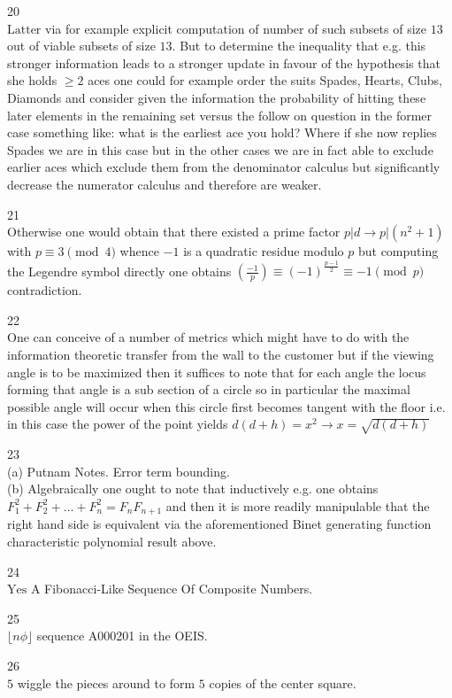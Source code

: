 20 \\
$\boxed{\text{Latter}}$ via for example explicit computation of number of such subsets of size $13$ out of viable subsets of size $13$. But to determine the inequality that e.g. this stronger information leads to a stronger update in favour of the hypothesis that she holds $\ge 2$ aces one could for example order the suits Spades, Hearts, Clubs, Diamonds and consider given the information the probability of hitting these later elements in the remaining set versus the follow on question in the former case something like: what is the earliest ace you hold? Where if she now replies Spades we are in this case but in the other cases we are in fact able to exclude earlier aces which exclude them from the denominator calculus but significantly decrease the numerator calculus and therefore are weaker.

21 \\
Otherwise one would obtain that there existed a prime factor $p|d \to p|(n^2+1)$ with $p \equiv 3 \pmod{4}$ whence $-1$ is a quadratic residue modulo $p$ but computing the Legendre symbol directly one obtains $\left(\frac{-1}{p}\right) \equiv (-1)^{\frac{p-1}{2}} \equiv -1 \pmod{p}$ contradiction.

22 \\
One can conceive of a number of metrics which might have to do with the information theoretic transfer from the wall to the customer but if the viewing angle is to be maximized then it suffices to note that for each angle the locus forming that angle is a sub section of a circle so in particular the maximal possible angle will occur when this circle first becomes tangent with the floor i.e. in this case the power of the point yields $d(d+h)=x^2 \to x=\boxed{\sqrt{d(d+h)}}$

23 \\
(a) Putnam Notes. Error term bounding. \\
(b) Algebraically one ought to note that inductively e.g. one obtains $F_1^2+F_2^2+\dots +F_n^2 = F_n F_{n+1}$ and then it is more readily manipulable that the right hand side is equivalent via the aforementioned Binet generating function characteristic polynomial result above.

24 \\
$\boxed{\text{Yes}}$ A Fibonacci-Like Sequence Of Composite Numbers.

25 \\
$\boxed{\lfloor n\phi \rfloor}$ sequence A000201 in the OEIS.

26 \\
$\boxed{5}$ wiggle the pieces around to form $5$ copies of the center square.

